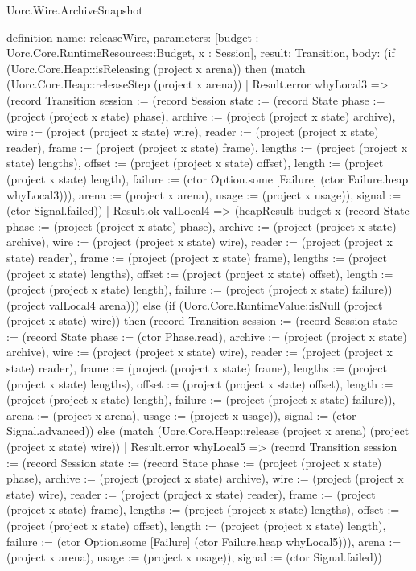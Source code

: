\begin{lexlean}{Uorc.Wire.ArchiveSnapshot}
\begin{semanticmodule}
definition{
  name: releaseWire,
  parameters: [budget : Uorc.Core.RuntimeResources::Budget, x : Session],
  result: Transition,
  body: (if (Uorc.Core.Heap::isReleasing (project x arena)) then (match (Uorc.Core.Heap::releaseStep (project x arena))
    | Result.error whyLocal3 => (record Transition {session := (record Session {state := (record State {phase := (project (project x state) phase), archive := (project (project x state) archive), wire := (project (project x state) wire), reader := (project (project x state) reader), frame := (project (project x state) frame), lengths := (project (project x state) lengths), offset := (project (project x state) offset), length := (project (project x state) length), failure := (ctor Option.some [Failure] (ctor Failure.heap whyLocal3))}), arena := (project x arena), usage := (project x usage)}), signal := (ctor Signal.failed)})
    | Result.ok valLocal4 => (heapResult budget x (record State {phase := (project (project x state) phase), archive := (project (project x state) archive), wire := (project (project x state) wire), reader := (project (project x state) reader), frame := (project (project x state) frame), lengths := (project (project x state) lengths), offset := (project (project x state) offset), length := (project (project x state) length), failure := (project (project x state) failure)}) (project valLocal4 arena))) else (if (Uorc.Core.RuntimeValue::isNull (project (project x state) wire)) then (record Transition {session := (record Session {state := (record State {phase := (ctor Phase.read), archive := (project (project x state) archive), wire := (project (project x state) wire), reader := (project (project x state) reader), frame := (project (project x state) frame), lengths := (project (project x state) lengths), offset := (project (project x state) offset), length := (project (project x state) length), failure := (project (project x state) failure)}), arena := (project x arena), usage := (project x usage)}), signal := (ctor Signal.advanced)}) else (match (Uorc.Core.Heap::release (project x arena) (project (project x state) wire))
    | Result.error whyLocal5 => (record Transition {session := (record Session {state := (record State {phase := (project (project x state) phase), archive := (project (project x state) archive), wire := (project (project x state) wire), reader := (project (project x state) reader), frame := (project (project x state) frame), lengths := (project (project x state) lengths), offset := (project (project x state) offset), length := (project (project x state) length), failure := (ctor Option.some [Failure] (ctor Failure.heap whyLocal5))}), arena := (project x arena), usage := (project x usage)}), signal := (ctor Signal.failed)})
}
\end{semanticmodule}
\end{lexlean}

